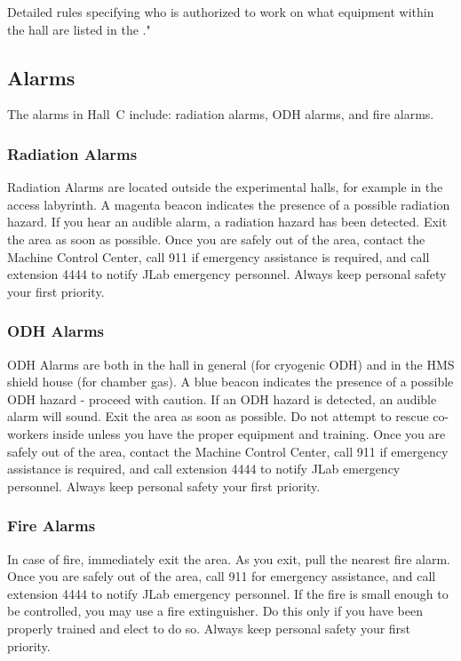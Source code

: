 Detailed rules specifying who is authorized to work on what equipment
within the hall
are listed in the ." 

\subsection{Alarms}

The alarms in Hall~C include: radiation alarms, ODH alarms, and fire 
alarms.


\subsubsection{Radiation Alarms}
Radiation Alarms are located outside the experimental halls, for example
in the access
labyrinth. A magenta beacon indicates the presence of a possible radiation
hazard. If you hear an
audible alarm, a radiation  hazard has been detected. Exit the area as soon
as possible. Once you
are safely out of the area, contact the Machine Control Center, call 911 if
emergency assistance
is required, and call extension 4444 to notify JLab emergency personnel.
Always keep
personal safety your first priority.

\subsubsection{ODH Alarms}
ODH Alarms are both in the hall in general (for cryogenic ODH) and in 
the HMS shield
house (for chamber gas). A blue beacon indicates the presence of a possible
ODH hazard -
proceed with caution. If an ODH hazard is detected, an audible alarm will
sound. Exit the area
as soon as possible. Do not attempt to rescue co-workers inside unless you
have the proper
equipment and training. Once you are safely out of the area, contact the
Machine Control Center,
call 911 if emergency assistance is required, and call extension 4444 to
notify JLab
emergency personnel. Always keep personal safety your first priority.

\subsubsection{Fire Alarms}
 In case of fire, immediately exit the area. As you exit, 
pull the nearest fire
alarm. Once you are safely out of the area, call 911 for emergency
assistance, and call extension
4444 to notify JLab emergency personnel. If the fire is small enough to be
controlled, you
may use a fire extinguisher. Do this only if you have been properly trained
and elect to do so.
Always keep personal safety your first priority.


